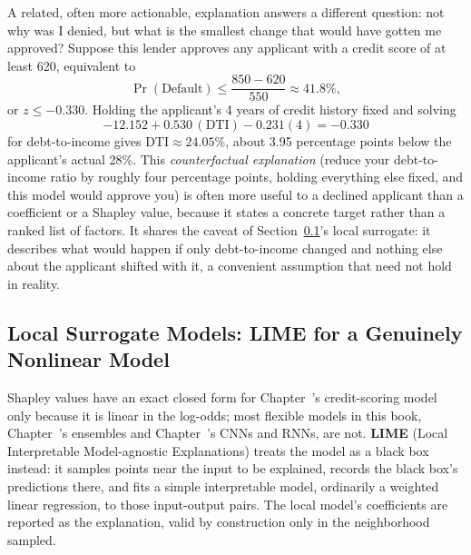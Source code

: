 \documentclass[../ai_in_finance]{subfiles}
\begin{document}
A related, often more actionable, explanation answers a different question: not why was I denied, but what is the smallest change that would have gotten me approved? Suppose this lender approves any applicant with a credit score of at least 620, equivalent to
$$\Pr(\text{Default}) \le \frac{850-620}{550} \approx 41.8\%,$$
or $z \le -0.330$. Holding the applicant's 4 years of credit history fixed and solving
$$-12.152 + 0.530\,(\text{DTI}) - 0.231(4) = -0.330$$
for debt-to-income gives $\text{DTI} \approx 24.05\%$, about 3.95 percentage points below the applicant's actual 28\%. This \emph{counterfactual explanation} (reduce your debt-to-income ratio by roughly four percentage points, holding everything else fixed, and this model would approve you) is often more useful to a declined applicant than a coefficient or a Shapley value, because it states a concrete target rather than a ranked list of factors. It shares the caveat of Section~\ref{sec:lime-explain}'s local surrogate: it describes what would happen if only debt-to-income changed and nothing else about the applicant shifted with it, a convenient assumption that need not hold in reality.

\subsection{Local Surrogate Models: LIME for a Genuinely Nonlinear Model}
\label{sec:lime-explain}

Shapley values have an exact closed form for Chapter~'s credit-scoring model only because it is linear in the log-odds; most flexible models in this book, Chapter~'s ensembles and Chapter~'s CNNs and RNNs, are not. \textbf{LIME} (Local Interpretable Model-agnostic Explanations) treats the model as a black box instead: it samples points near the input to be explained, records the black box's predictions there, and fits a simple interpretable model, ordinarily a weighted linear regression, to those input-output pairs. The local model's coefficients are reported as the explanation, valid by construction only in the neighborhood sampled.
\end{document}
